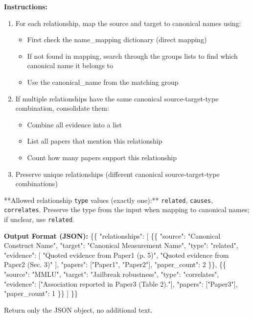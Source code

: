 \begin{tcolorbox}[breakable,enhanced,colback=blue!3,colframe=blue!40!black,title={Prompt},fonttitle=\bfseries,left=8pt,right=8pt,top=6pt,bottom=6pt]
\textbf{Instructions:}
\begin{enumerate}
\item For each relationship, map the source and target to canonical names using:
\begin{itemize}
\item First check the name\_mapping dictionary (direct mapping)
\item If not found in mapping, search through the groups lists to find which canonical name it belongs to
\item Use the canonical\_name from the matching group
\end{itemize}
\item If multiple relationships have the same canonical source-target-type combination, consolidate them:
\begin{itemize}
\item Combine all evidence into a list
\item List all papers that mention this relationship
\item Count how many papers support this relationship
\end{itemize}
\item Preserve unique relationships (different canonical source-target-type combinations)
\end{enumerate}

**Allowed relationship \texttt{type} values (exactly one):** \texttt{related}, \texttt{causes}, \texttt{correlates}. Preserve the type from the input when mapping to canonical names; if unclear, use \texttt{related}.

\textbf{Output Format (JSON):}
\{\{
  "relationships": [
    \{\{
      "source": "Canonical Construct Name",
      "target": "Canonical Measurement Name",
      "type": "related",
      "evidence": [
        "Quoted evidence from Paper1 (p. 5)",
        "Quoted evidence from Paper2 (Sec. 3)"
      ],
      "papers": ["Paper1", "Paper2"],
      "paper\_count": 2
    \}\},
    \{\{
      "source": "MMLU",
      "target": "Jailbreak robustness",
      "type": "correlates",
      "evidence": ["Association reported in Paper3 (Table 2)."],
      "papers": ["Paper3"],
      "paper\_count": 1
    \}\}
  ]
\}\}

Return only the JSON object, no additional text.
\end{tcolorbox}
